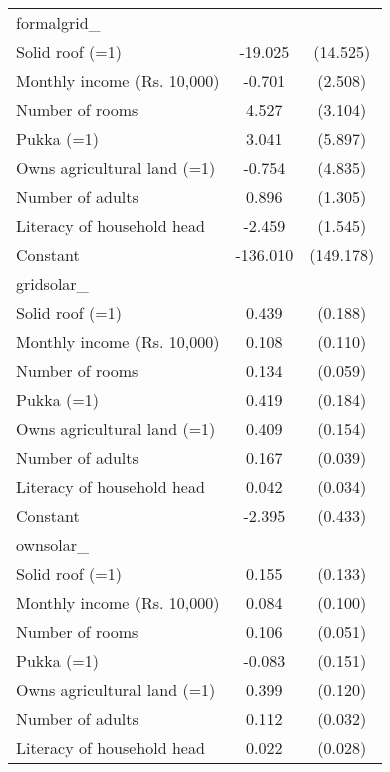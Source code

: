 \begin{table}[htbp]
{\begin{tabular}{l*{1}{cc}}
\midrule
formalgrid\_         &                     &            \\
Solid roof (=1)     &     -19.025         &    (14.525)\\
Monthly income (Rs. 10,000)&      -0.701         &     (2.508)\\
Number of rooms     &       4.527         &     (3.104)\\
Pukka (=1)          &       3.041         &     (5.897)\\
Owns agricultural land (=1)&      -0.754         &     (4.835)\\
Number of adults    &       0.896         &     (1.305)\\
Literacy of household head&      -2.459         &     (1.545)\\
Constant            &    -136.010         &   (149.178)\\
\midrule
gridsolar\_          &                     &            \\
Solid roof (=1)     &       0.439\sym{**} &     (0.188)\\
Monthly income (Rs. 10,000)&       0.108         &     (0.110)\\
Number of rooms     &       0.134\sym{**} &     (0.059)\\
Pukka (=1)          &       0.419\sym{**} &     (0.184)\\
Owns agricultural land (=1)&       0.409\sym{***}&     (0.154)\\
Number of adults    &       0.167\sym{***}&     (0.039)\\
Literacy of household head&       0.042         &     (0.034)\\
Constant            &      -2.395\sym{***}&     (0.433)\\
\midrule
ownsolar\_           &                     &            \\
Solid roof (=1)     &       0.155         &     (0.133)\\
Monthly income (Rs. 10,000)&       0.084         &     (0.100)\\
Number of rooms     &       0.106\sym{**} &     (0.051)\\
Pukka (=1)          &      -0.083         &     (0.151)\\
Owns agricultural land (=1)&       0.399\sym{***}&     (0.120)\\
Number of adults    &       0.112\sym{***}&     (0.032)\\
Literacy of household head&       0.022         &     (0.028)\\

\end{tabular}}
\end{table}
